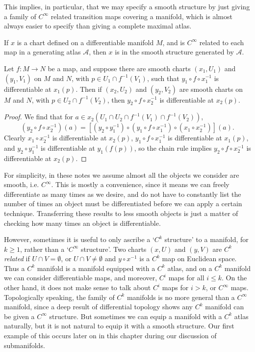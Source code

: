 This implies, in particular, that we may specify a smooth structure by just giving a family of $C^\infty$ related transition maps covering a manifold, which is almost always easier to specify than giving a complete maximal atlas.

\begin{corollary}
    If $x$ is a chart defined on a differentiable manifold $M$, and is $C^\infty$ related to each map in a generating atlas $\mathcal{A}$, then $x$ is in the smooth structure generated by $\mathcal{A}$.
\end{corollary}

\begin{lemma}
    Let $f: M \to N$ be a map, and suppose there are smooth charts $(x_1,U_1)$ and $(y_1,V_1)$ on $M$ and $N$, with $p \in U_1 \cap f^{-1}(V_1)$, such that $y_1 \circ f \circ x_1^{-1}$ is differentiable at $x_1(p)$. Then if $(x_2,U_2)$ and $(y_2,V_2)$ are smooth charts on $M$ and $N$, with $p \in U_2 \cap f^{-1}(V_2)$, then $y_2 \circ f \circ x_2^{-1}$ is differentiable at $x_2(p)$.
\end{lemma}
\begin{proof}
    We find that for $a \in x_2(U_1 \cap U_2 \cap f^{-1}(V_1) \cap f^{-1}(V_2))$,
    \[ (y_2 \circ f \circ x_2^{-1})(a) = [(y_2 \circ y_1^{-1}) \circ (y_1 \circ f \circ x_1^{-1}) \circ (x_1 \circ x_2^{-1})](a). \]
    Clearly $x_1 \circ x_2^{-1}$ is differentiable at $x_2(p)$, $y_1 \circ f \circ x_1^{-1}$ is differentiable at $x_1(p)$, and $y_2 \circ y_1^{-1}$ is differentiable at $y_1(f(p))$, so the chain rule implies $y_2 \circ f \circ x_2^{-1}$ is differentiable at $x_2(p)$.
\end{proof}

For simplicity, in these notes we assume almost all the objects we consider are smooth, i.e. $C^\infty$. This is mostly a convenience, since it means we can freely differentiate as many times as we desire, and do not have to constantly list the number of times an object must be differentiated before we can apply a certain technique. Transferring these results to less smooth objects is just a matter of checking how many times an object is differentiable.

However, sometimes it is useful to only ascribe a `$C^k$ structure' to a manifold, for $k \geq 1$, rather than a `$C^\infty$ structure'. Two charts $(x,U)$ and $(y,V)$ are \emph{$C^k$ related} if $U \cap V = \emptyset$, or $U \cap V \neq \emptyset$ and $y \circ x^{-1}$ is a $C^k$ map on Euclidean space. Thus a $C^k$ manifold is a manifold equipped with a $C^k$ atlas, and on a $C^k$ manifold we can consider differentiable maps, and moreover, $C^i$ maps for all $i \leq k$. On the other hand, it does not make sense to talk about $C^i$ maps for $i > k$, or $C^\infty$ maps. Topologically speaking, the family of $C^k$ manifolds is no more general than a $C^\infty$ manifold, since a deep result of differential topology shows any $C^k$ manifold can be given a $C^\infty$ structure. But sometimes we can equip a manifold with a $C^k$ atlas naturally, but it is not natural to equip it with a smooth structure. Our first example of this occurs later on in this chapter during our discussion of submanifolds.

